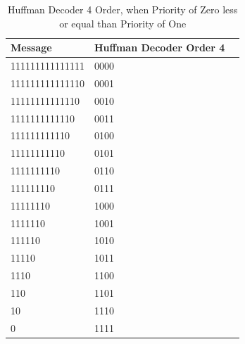 \begin{refsection}
\begin{table}[H]
\centering
\caption{Huffman Decoder 4 Order, when Priority of Zero less or equal than Priority of One}
\label{tb:hufmmandecoder6}
\begin{tabular}{|l|l|l|}
\hline
\textbf{Message}                      & \textbf{Huffman Decoder Order 4}                                       \\ \hline
111111111111111         & 0000                                                \\ \hline
111111111111110         & 0001                                      \\ \hline
11111111111110           & 0010                                  \\ \hline
1111111111110             & 0011                          \\ \hline
111111111110               & 0100                                           \\ \hline
11111111110                 & 0101                                          \\ \hline
1111111110                   & 0110                                      \\ \hline
111111110                     & 0111                                    \\ \hline
11111110                       & 1000                                   \\ \hline
1111110                         & 1001                                 \\ \hline
111110                           & 1010                              \\ \hline
11110                             & 1011                      \\ \hline
1110                               & 1100                           \\ \hline
110                                 & 1101                         \\ \hline
10                                   & 1110                      \\ \hline
 0                                    & 1111                     \\ \hline
\end{tabular}
\end{table}



\end{refsection}
